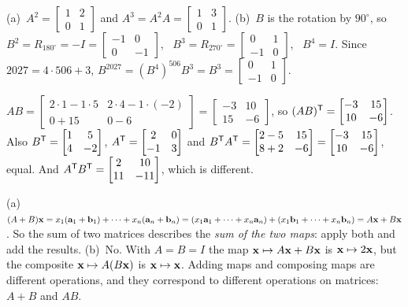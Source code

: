 \documentclass[11pt]{article}
\begin{document}
\begin{description}[leftmargin=0pt,itemsep=5pt]
  \item[Knowledge Check \ref{kc:powers}.] (a)~$A^2=\begin{bmatrix}1&2\\0&1\end{bmatrix}$ and $A^3=A^2A=\begin{bmatrix}1&3\\0&1\end{bmatrix}$. (b)~$B$ is the rotation by $90^\circ$, so $B^2=R_{180^\circ}=-I=\begin{bmatrix}-1&0\\0&-1\end{bmatrix}$, \ $B^3=R_{270^\circ}=\begin{bmatrix}0&1\\-1&0\end{bmatrix}$, \ $B^4=I$. Since $2027=4\cdot506+3$, $B^{2027}=(B^4)^{506}B^3=B^3=\begin{bmatrix}0&1\\-1&0\end{bmatrix}$.
  \item[Knowledge Check \ref{kc:transposekc}.] $AB=\begin{bmatrix}2\cdot1-1\cdot5&2\cdot4-1\cdot(-2)\\0+15&0-6\end{bmatrix}=\begin{bmatrix}-3&10\\15&-6\end{bmatrix}$, so $(AB)^{\mathsf T}=\begin{bmatrix}-3&15\\10&-6\end{bmatrix}$. Also $B^{\mathsf T}=\begin{bmatrix}1&5\\4&-2\end{bmatrix}$, $A^{\mathsf T}=\begin{bmatrix}2&0\\-1&3\end{bmatrix}$ and $B^{\mathsf T} A^{\mathsf T}=\begin{bmatrix}2-5&15\\8+2&-6\end{bmatrix}=\begin{bmatrix}-3&15\\10&-6\end{bmatrix}$, equal. And $A^{\mathsf T} B^{\mathsf T}=\begin{bmatrix}2&10\\11&-11\end{bmatrix}$, which is different.
  \item[Pause and think \ref{think:addmaps}.] (a)~$(A+B)\mathbf{x}=x_1(\mathbf{a}_1+\mathbf{b}_1)+\cdots+x_n(\mathbf{a}_n+\mathbf{b}_n)=(x_1\mathbf{a}_1+\cdots+x_n\mathbf{a}_n)+(x_1\mathbf{b}_1+\cdots+x_n\mathbf{b}_n)=A\mathbf{x}+B\mathbf{x}$. So the sum of two matrices describes the \emph{sum of the two maps}: apply both and add the results. (b)~No. With $A=B=I$ the map $\mathbf{x}\mapsto A\mathbf{x}+B\mathbf{x}$ is $\mathbf{x}\mapsto2\mathbf{x}$, but the composite $\mathbf{x}\mapsto A(B\mathbf{x})$ is $\mathbf{x}\mapsto\mathbf{x}$. Adding maps and composing maps are different operations, and they correspond to different operations on matrices: $A+B$ and $AB$.

\end{description}
\end{document}
